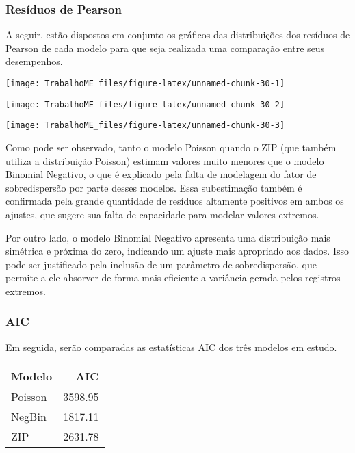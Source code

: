 \documentclass[
  twocolumn]{article}
\begin{document}
\subsubsection{Resíduos de Pearson}\label{resuxedduos-de-pearson-1}

A seguir, estão dispostos em conjunto os gráficos das distribuições dos
resíduos de Pearson de cada modelo para que seja realizada uma
comparação entre seus desempenhos.

\begin{center}\texttt{[image: TrabalhoME\_files/figure-latex/unnamed-chunk-30-1]} \end{center}

\begin{center}\texttt{[image: TrabalhoME\_files/figure-latex/unnamed-chunk-30-2]} \end{center}

\begin{center}\texttt{[image: TrabalhoME\_files/figure-latex/unnamed-chunk-30-3]} \end{center}

Como pode ser observado, tanto o modelo Poisson quando o ZIP (que também
utiliza a distribuição Poisson) estimam valores muito menores que o
modelo Binomial Negativo, o que é explicado pela falta de modelagem do
fator de sobredispersão por parte desses modelos. Essa subestimação
também é confirmada pela grande quantidade de resíduos altamente
positivos em ambos os ajustes, que sugere sua falta de capacidade para
modelar valores extremos.

Por outro lado, o modelo Binomial Negativo apresenta uma distribuição
mais simétrica e próxima do zero, indicando um ajuste mais apropriado
aos dados. Isso pode ser justificado pela inclusão de um parâmetro de
sobredispersão, que permite a ele absorver de forma mais eficiente a
variância gerada pelos registros extremos.

\subsubsection{AIC}\label{aic-1}

Em seguida, serão comparadas as estatísticas AIC dos três modelos em
estudo.

\begin{center}
\begin{tabular}{lr}
  \hline
Modelo & AIC \\ 
  \hline
Poisson & 3598.95 \\ 
  NegBin & 1817.11 \\ 
  ZIP & 2631.78 \\ 
   \hline
\end{tabular}
\end{center}
\end{document}
